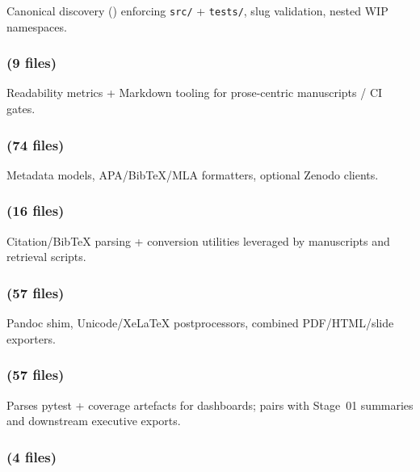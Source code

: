 \documentclass[
]{article}
\begin{document}
Canonical discovery () enforcing
\texttt{src/} + \texttt{tests/}, slug validation, nested WIP namespaces.

\subsubsection{\texorpdfstring{ (9
files)}{infrastructure.prose (9 files)}}\label{infrastructure.prose-9-files}

Readability metrics + Markdown tooling for prose-centric manuscripts /
CI gates.

\subsubsection{\texorpdfstring{ (74
files)}{infrastructure.publishing (74 files)}}\label{infrastructure.publishing-74-files}

Metadata models, APA/BibTeX/MLA formatters, optional Zenodo clients.

\subsubsection{\texorpdfstring{ (16
files)}{infrastructure.reference (16 files)}}\label{infrastructure.reference-16-files}

Citation/BibTeX parsing + conversion utilities leveraged by manuscripts
and retrieval scripts.

\subsubsection{\texorpdfstring{ (57
files)}{infrastructure.rendering (57 files)}}\label{infrastructure.rendering-57-files}

Pandoc shim, Unicode/XeLaTeX postprocessors, combined PDF/HTML/slide
exporters.

\subsubsection{\texorpdfstring{ (57
files)}{infrastructure.reporting (57 files)}}\label{infrastructure.reporting-57-files}

Parses pytest + coverage artefacts for dashboards; pairs with Stage~01
summaries and downstream executive exports.

\subsubsection{\texorpdfstring{ (4
files)}{infrastructure.scientific (4 files)}}\label{infrastructure.scientific-4-files}
\end{document}
